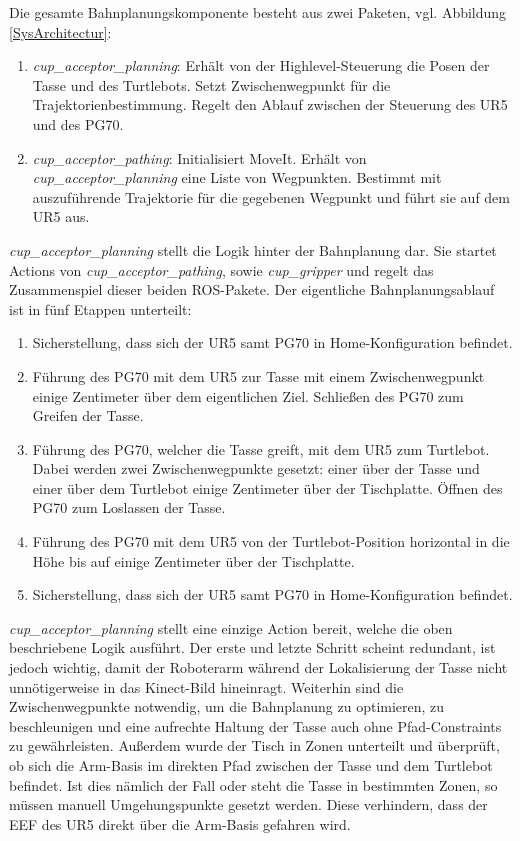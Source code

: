 Die gesamte Bahnplanungskomponente besteht aus zwei Paketen, vgl. Abbildung \ref{SysArchitectur}:
\begin{enumerate}
	\item \textit{cup\_acceptor\_planning}:
				\newline
				Erhält von der Highlevel-Steuerung die Posen der Tasse und des Turtlebots. Setzt Zwischenwegpunkt für die Trajektorienbestimmung. Regelt den Ablauf zwischen der Steuerung des UR5 und des PG70.
	\item \textit{cup\_acceptor\_pathing}:
				\newline
				Initialisiert MoveIt. Erhält von \textit{cup\_acceptor\_planning} eine Liste von Wegpunkten. Bestimmt mit auszuführende Trajektorie für die gegebenen Wegpunkt und führt sie auf dem UR5 aus.
\end{enumerate}
\textit{cup\_acceptor\_planning} stellt die Logik hinter der Bahnplanung dar. Sie startet Actions von \textit{cup\_acceptor\_pathing}, sowie \textit{cup\_gripper} und regelt das Zusammenspiel dieser beiden ROS-Pakete. Der eigentliche Bahnplanungsablauf ist in fünf Etappen unterteilt:
\begin{enumerate}
	\item Sicherstellung, dass sich der UR5 samt PG70 in Home-Konfiguration befindet.
	\item Führung des PG70 mit dem UR5 zur Tasse mit einem Zwischenwegpunkt einige Zentimeter über dem eigentlichen Ziel. Schließen des PG70 zum Greifen der Tasse.
	\item Führung des PG70, welcher die Tasse greift, mit dem UR5 zum Turtlebot. Dabei werden zwei Zwischenwegpunkte gesetzt: einer über der Tasse und einer über dem Turtlebot einige Zentimeter über der Tischplatte. Öffnen des PG70 zum Loslassen der Tasse.
	\item Führung des PG70 mit dem UR5 von der Turtlebot-Position horizontal in die Höhe bis auf einige Zentimeter über der Tischplatte.
	\item Sicherstellung, dass sich der UR5 samt PG70 in Home-Konfiguration befindet.
\end{enumerate}
\textit{cup\_acceptor\_planning} stellt eine einzige Action bereit, welche die oben beschriebene Logik ausführt. Der erste und letzte Schritt scheint redundant, ist jedoch wichtig, damit der Roboterarm während der Lokalisierung der Tasse nicht unnötigerweise in das Kinect-Bild hineinragt. Weiterhin sind die Zwischenwegpunkte notwendig, um die Bahnplanung zu optimieren, zu beschleunigen und eine aufrechte Haltung der Tasse auch ohne Pfad-Constraints zu gewährleisten. Außerdem wurde der Tisch in Zonen unterteilt und überprüft, ob sich die Arm-Basis im direkten Pfad zwischen der Tasse und dem Turtlebot befindet. Ist dies nämlich der Fall oder steht die Tasse in bestimmten Zonen, so müssen manuell Umgehungspunkte gesetzt werden. Diese verhindern, dass der EEF des UR5 direkt über die Arm-Basis gefahren wird.
